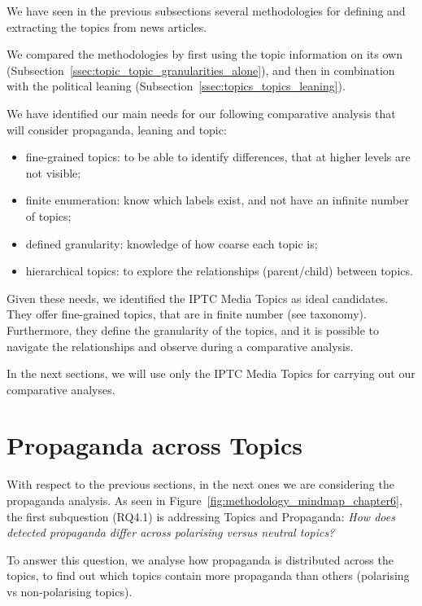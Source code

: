 We have seen in the previous subsections several methodologies for defining and extracting the topics from news articles.

We compared the methodologies by first using the topic information on its own (Subsection~\ref{ssec:topic_topic_granularities_alone}), and then in combination with the political leaning (Subsection~\ref{ssec:topics_topics_leaning}).

We have identified our main needs for our following comparative analysis that will consider propaganda, leaning and topic:

\begin{itemize}
    \item fine-grained topics: to be able to identify differences, that at higher levels are not visible;
    \item finite enumeration: know which labels exist, and not have an infinite number of topics;
    \item defined granularity: knowledge of how coarse each topic is; %
    \item hierarchical topics: to explore the relationships (parent/child) between topics.
\end{itemize}

Given these needs, we identified the IPTC Media Topics as ideal candidates.
They offer fine-grained topics, that are in finite number (see taxonomy). Furthermore, they define the granularity of the topics, and it is possible to navigate the relationships and observe during a comparative analysis.

In the next sections, we will use only the IPTC Media Topics for carrying out our comparative analyses.


\section{\statusgreen Propaganda across Topics}
\label{sec:topic_propaganda}

With respect to the previous sections, in the next ones we are considering the propaganda analysis. As seen in Figure~\ref{fig:methodology_mindmap_chapter6}, the first subquestion (RQ4.1) is addressing Topics and Propaganda:
\emph{How does detected propaganda differ across polarising versus neutral topics?}

To answer this question, we analyse how propaganda is distributed across the topics, to find out which topics contain more propaganda than others (polarising vs non-polarising topics).

